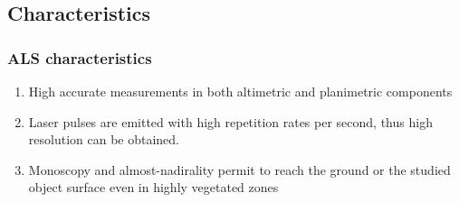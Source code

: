 \subsection{Characteristics}
\begin{frame}[label=lidar_charact]
    \frametitle{ALS characteristics}
    \begin{enumerate}
    	\item High \alert{accurate measurements} in both altimetric and planimetric components
    	\item Laser pulses are emitted with high repetition rates per second, thus \alert{high resolution} can be obtained.
    	\item \alert{Monoscopy} and \alert{almost-nadirality} permit to reach the ground or the studied object surface even in highly vegetated zones
\end{enumerate}
\end{frame}
